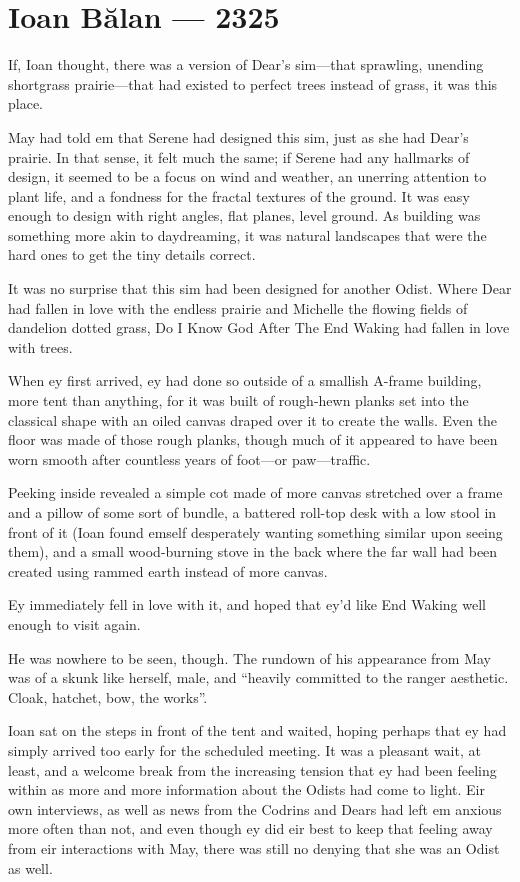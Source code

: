 \hypertarget{ioan-bux103lan-2325}{%
\chapter{Ioan Bălan — 2325}\label{ioan-bux103lan-2325}}

If, Ioan thought, there was a version of Dear's sim---that sprawling, unending shortgrass prairie---that had existed to perfect trees instead of grass, it was this place.

May had told em that Serene had designed this sim, just as she had Dear's prairie. In that sense, it felt much the same; if Serene had any hallmarks of design, it seemed to be a focus on wind and weather, an unerring attention to plant life, and a fondness for the fractal textures of the ground. It was easy enough to design with right angles, flat planes, level ground. As building was something more akin to daydreaming, it was natural landscapes that were the hard ones to get the tiny details correct.

It was no surprise that this sim had been designed for another Odist. Where Dear had fallen in love with the endless prairie and Michelle the flowing fields of dandelion dotted grass, Do I Know God After The End Waking had fallen in love with trees.

When ey first arrived, ey had done so outside of a smallish A-frame building, more tent than anything, for it was built of rough-hewn planks set into the classical shape with an oiled canvas draped over it to create the walls. Even the floor was made of those rough planks, though much of it appeared to have been worn smooth after countless years of foot---or paw---traffic.

Peeking inside revealed a simple cot made of more canvas stretched over a frame and a pillow of some sort of bundle, a battered roll-top desk with a low stool in front of it (Ioan found emself desperately wanting something similar upon seeing them), and a small wood-burning stove in the back where the far wall had been created using rammed earth instead of more canvas.

Ey immediately fell in love with it, and hoped that ey'd like End Waking well enough to visit again.

He was nowhere to be seen, though. The rundown of his appearance from May was of a skunk like herself, male, and ``heavily committed to the ranger aesthetic. Cloak, hatchet, bow, the works''.

Ioan sat on the steps in front of the tent and waited, hoping perhaps that ey had simply arrived too early for the scheduled meeting. It was a pleasant wait, at least, and a welcome break from the increasing tension that ey had been feeling within as more and more information about the Odists had come to light. Eir own interviews, as well as news from the Codrins and Dears had left em anxious more often than not, and even though ey did eir best to keep that feeling away from eir interactions with May, there was still no denying that she was an Odist as well.

